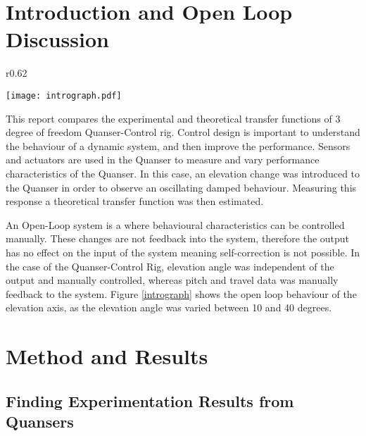 \section{Introduction and Open Loop
Discussion}\label{introduction-and-open-loop-discussion}

\begin{wrapfigure}{r}{0.62\textwidth}
  \begin{center}
  \vspace{-20pt}
  \texttt{[image: intrograph.pdf]}
  \end{center}
  \caption{Graph Showing the Open Loop Nature of the Experimental Quanser Response}
  \label{intrograph}
  \vspace{-15pt}
\end{wrapfigure}

This report compares the experimental and theoretical transfer functions
of 3 degree of freedom Quanser-Control rig. Control design is important
to understand the behaviour of a dynamic system, and then improve the
performance. Sensors and actuators are used in the Quanser to measure
and vary performance characteristics of the Quanser. In this case, an
elevation change was introduced to the Quanser in order to observe an
oscillating damped behaviour. Measuring this response a theoretical
transfer function was then estimated.

An Open-Loop system is a where behavioural characteristics can be
controlled manually. These changes are not feedback into the system,
therefore the output has no effect on the input of the system
\cite{openloop} meaning self-correction is not possible. In the case of
the Quanser-Control Rig, elevation angle was independent of the output
and manually controlled, whereas pitch and travel data was manually
feedback to the system. Figure \ref{intrograph} shows the open loop
behaviour of the elevation axis, as the elevation angle was varied
between 10 and 40 degrees.

\section{Method and Results}\label{method-and-results}

\subsection{Finding Experimentation Results from
Quansers}\label{finding-experimentation-results-from-quansers}


